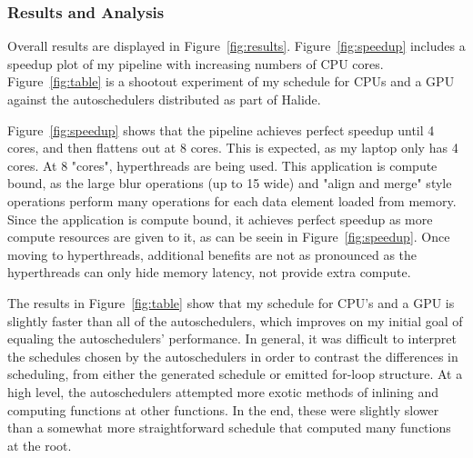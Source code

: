 \documentclass{article}
\begin{document}
\subsubsection{Results and Analysis}

Overall results are displayed in Figure~\ref{fig:results}.
%
Figure~\ref{fig:speedup} includes a speedup plot of my pipeline with increasing numbers of CPU cores.
%
Figure~\ref{fig:table} is a shootout experiment of my schedule for CPUs and a GPU against the autoschedulers distributed as part of Halide.

Figure~\ref{fig:speedup} shows that the pipeline achieves perfect speedup until 4 cores, and then flattens out at 8 cores.
%
This is expected, as my laptop only has 4 cores. At 8 "cores", hyperthreads are being used.
%
This application is compute bound, as the large blur operations (up to 15 wide) and "align and merge" style operations perform many operations
for each data element loaded from memory.
%
Since the application is compute bound, it achieves perfect speedup as more compute resources are given to it, as can be seein in Figure~\ref{fig:speedup}.
%
Once moving to hyperthreads, additional benefits are not as pronounced as the hyperthreads can only hide memory latency, not provide extra compute.

The results in Figure~\ref{fig:table} show that my schedule for CPU's and a GPU is slightly faster than all of the autoschedulers, which
improves on my initial goal of equaling the autoschedulers' performance.
%
In general, it was difficult to interpret the schedules chosen by the autoschedulers in order to contrast the differences in scheduling,
from either the generated schedule or emitted for-loop structure.
%
At a high level, the autoschedulers attempted more exotic methods of inlining and computing functions at other functions.
%
In the end, these were slightly slower than a somewhat more straightforward schedule that computed many functions at the root.
\end{document}
